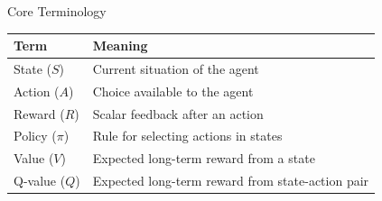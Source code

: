 \documentclass[aspectratio=169]{beamer}
\newcommand{\defaultdeckrefs}{AIMA4e Ch.22 pp.789--822; Poole3e Ch.13 pp.583--608}
\newcommand{\currentsliderefs}{\defaultdeckrefs}
\newcommand{\setslideref}[1]{\gdef\currentsliderefs{#1}}
\begin{document}
\setslideref{AIMA4e Ch.22 pp.789--822; Poole3e Ch.13 pp.583--608}
\begin{frame}{Core Terminology}
\begin{center}
\begin{tabular}{@{}ll@{}}
\toprule
Term & Meaning \\
\midrule
State ($S$) & Current situation of the agent \\
Action ($A$) & Choice available to the agent \\
Reward ($R$) & Scalar feedback after an action \\
Policy ($\pi$) & Rule for selecting actions in states \\
Value ($V$) & Expected long-term reward from a state \\
Q-value ($Q$) & Expected long-term reward from state-action pair \\
\bottomrule
\end{tabular}
\end{center}
\end{frame}
\end{document}
